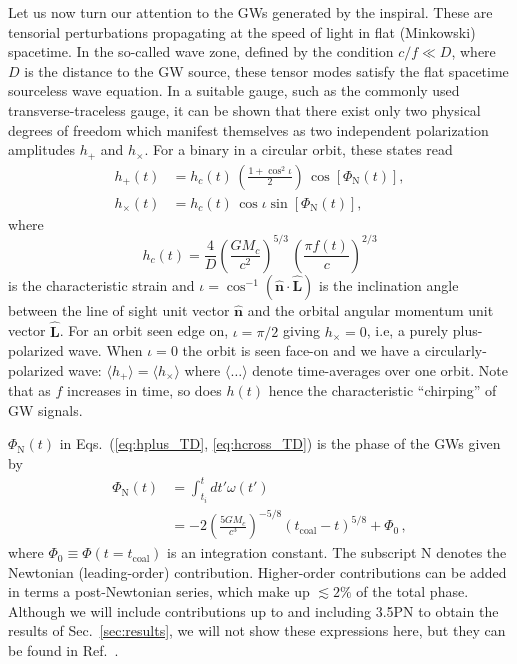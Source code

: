 \documentclass[prd,amsmath,amssymb,aps,floats,amsfonts,notitlepage,superscriptaddress,eqsecnum,nofootinbib,10pt]{revtex4-1}
\newcommand{\nn}{\nonumber}
\newcommand{\f}{\frac}
\newcommand{\be}{\begin{equation}}
\newcommand{\ee}{\end{equation}}
\begin{document}
Let us now turn our attention to the GWs generated by the inspiral.
These are tensorial perturbations propagating at the speed of light in flat (Minkowski) spacetime.
In the so-called wave zone, defined by the condition $ c/f \ll D$, where $D$ is the distance to the GW source, 
these tensor modes satisfy the flat spacetime sourceless wave equation. %
In a suitable gauge, such as the commonly used transverse-traceless gauge, 
it can be shown that there exist only two physical degrees of freedom which manifest themselves as two independent polarization amplitudes $h_+$ and $h_\times$. %
For a binary in a circular orbit, these states read
%
\begin{align}
 h_+(t) &= h_c(t)\, \left(\f{1+\cos^2\iota}{2}\right)\, \cos[\Phi_\text{N}(t)],\label{eq:hplus_TD}\\
 h_\times(t) & =h_c(t)\,\cos\iota \sin[\Phi_\text{N}(t)]\label{eq:hcross_TD},
\end{align}
%
%
where
%
\be
h_c(t) =\f{4}{D}\left(\f{G M_c}{c^2}\right)^{5/3}\, \left(\f{\pi f(t)}{c}\right)^{2/3} \label{eq:h_c}
\ee
is the characteristic strain and
$\iota=\cos^{-1}(\mathbf{\hat{n}}\cdot{\mathbf{\hat{L}}}) $ is the inclination angle between the line of sight unit vector $\mathbf{\hat{n}} $ and the orbital angular momentum unit vector $\mathbf{\hat{L}}$. 
For an orbit seen edge on, $\iota = \pi/2$ giving $h_\times=0$, i.e,  a purely plus-polarized wave.
When $\iota=0$ the orbit is seen face-on and we have a circularly-polarized wave: $\langle h_+ \rangle = \langle h_\times\rangle$ where $\langle \ldots \rangle$
denote time-averages over one orbit. Note that as $f$ increases in time, so does $h(t)$ hence the characteristic ``chirping'' of GW signals.

$\Phi_\text{N}(t)$ in Eqs.~(\ref{eq:hplus_TD}, \ref{eq:hcross_TD}) is the phase of the GWs given by
%
\begin{align}
\Phi_\text{N}(t) &=\int_{t_i}^t dt' \omega(t') \nn\\
&= -2\left(\f{5 G M_c}{c^3}\right)^{-5/8} (t_\text{coal}-t)^{5/8}+ \Phi_0 \, ,\label{eq:Phase}
\end{align}
%
where $\Phi_0 \equiv \Phi(t=t_\text{coal})$ is an integration constant. The subscript N denotes the Newtonian (leading-order) contribution. 
Higher-order contributions can be added in terms a post-Newtonian series, which make up $\lesssim 2\%$ of the total phase.
Although we will include contributions up to and including 3.5PN to obtain the results of Sec.~\ref{sec:results}, 
we will not show these expressions here, but they can be found in Ref.~\cite{Blanchet_LRR}.
\end{document}
